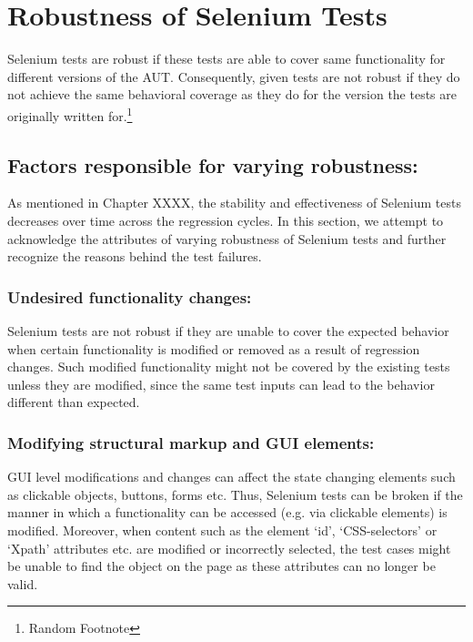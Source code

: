 \chapter{Robustness of Selenium Tests} %

\label{Chapter4} %


Selenium tests are robust if these tests are able to cover same functionality for different versions of the AUT. Consequently, given tests are not robust if they do not achieve the same behavioral coverage as they do for the version the tests are originally written for.\footnote{Random Footnote}

\section{Factors responsible for varying robustness:}
\label{sec:RobustnessFactors}
As mentioned in Chapter XXXX, the stability and effectiveness of Selenium tests decreases over time across the regression cycles. In this section, we attempt to acknowledge the attributes of varying robustness of Selenium tests and further recognize the reasons behind the test failures. 

\subsection{Undesired functionality changes:}
\label{sec:FuncChanges}
Selenium tests are not robust if they are unable to cover the expected behavior when certain functionality is modified or removed as a result of regression changes. Such modified functionality might not be covered by the existing tests unless they are modified, since the same test inputs can lead to the behavior different than expected.

\subsection{Modifying structural markup and GUI elements:}
\label{sec:GUIChanges}
GUI level modifications and changes can affect the state changing elements such as clickable objects, buttons, forms etc. Thus, Selenium tests can be broken if the manner in which a functionality can be accessed (e.g. via clickable elements) is modified. Moreover, when content such as the element ‘id’, ‘CSS-selectors’ or ‘Xpath’ attributes etc. are modified or incorrectly selected, the test cases might be unable to find the object on the page as these attributes can no longer be valid.

